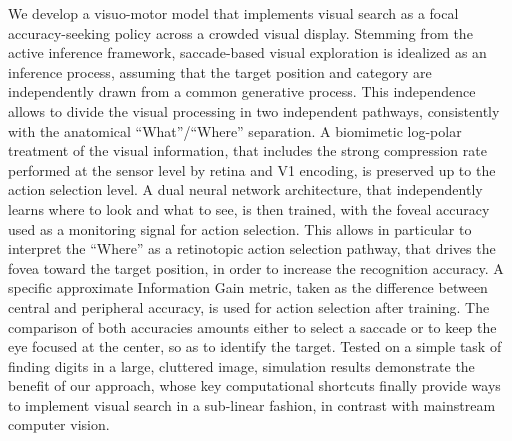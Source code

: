 

We develop a visuo-motor model that implements visual search as a focal accuracy-seeking policy across a crowded visual display. Stemming from the active inference framework, saccade-based visual exploration is idealized as an inference process, assuming that the target position and category are independently drawn from a common generative process. This independence allows to divide the visual processing in two independent pathways, consistently with the anatomical ``What''/``Where'' separation. A biomimetic log-polar treatment of the visual information, that includes the strong compression rate performed at the sensor level by retina and V1 encoding, is preserved up to the action selection level. A dual neural network architecture, that independently learns where to look and what to see, is then trained, with the foveal accuracy used as a monitoring signal for action selection. This allows in particular to interpret the ``Where'' as a retinotopic action selection pathway, that drives the fovea toward the target position, in order to increase the recognition accuracy. A specific approximate Information Gain metric, taken as the difference between central and peripheral accuracy, is used for action selection after training. The comparison of both accuracies amounts either to select a saccade or to keep the eye focused at the center, so as to identify the target. Tested on a simple task of finding digits in a large, cluttered image, simulation results demonstrate the benefit of our approach, whose key computational shortcuts finally provide ways to implement visual search in a sub-linear fashion, in contrast with mainstream computer vision. 


